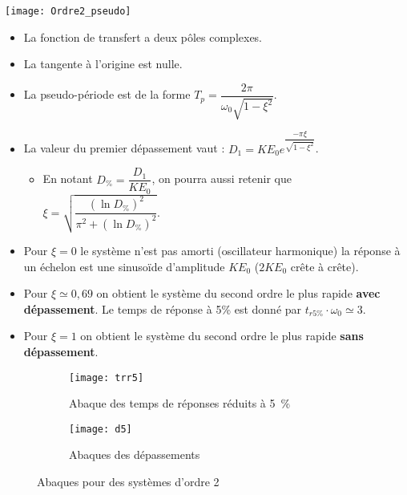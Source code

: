 \begin{marginfigure}
\texttt{[image: Ordre2\_pseudo]}
\end{marginfigure}

\begin{resultat}
\begin{itemize} 
\item La fonction de transfert a deux pôles complexes.
\item La tangente à l'origine est nulle.
\item La pseudo-période est de la forme $T_p=\dfrac{2\pi }{\omega_0 \sqrt{1-\xi^2}}$.
\item La valeur du premier dépassement vaut :  $D_1=KE_0e^{\dfrac{-\pi \xi }{\sqrt{1-\xi^2}}}$.
\begin{itemize}
\item En notant $D_{\%} =\dfrac{D_1}{KE_0}$, on pourra aussi retenir que $\xi = \sqrt{\dfrac{(\ln D_{\%})^2}{\pi^2 + (\ln D_{\%})^2}}$.
\end{itemize}
\end{itemize}
\end{resultat}

\begin{resultat}
\begin{itemize}
\item Pour $\xi=0$ le système n'est pas amorti (oscillateur harmonique) la réponse à un échelon est une sinusoïde d'amplitude $KE_0$ ($2KE_0$ crête à crête).  
\item Pour $\xi\simeq 0,69$  on obtient le système du second ordre le plus rapide \textbf{avec dépassement}. 
Le temps de réponse à 5\% est donné par $t_{r 5\%} \cdot \omega_0 \simeq 3$.
\item Pour $\xi =1$ on obtient le système du second ordre le plus rapide \textbf{sans dépassement}.

\end{itemize}
\end{resultat}


\begin{figure}
\centering
\begin{subfigure}{0.49\textwidth}
    \texttt{[image: trr5]}
    \caption{Abaque des temps de réponses réduits à 5\, \%}
    \label{fig:t5}
\end{subfigure}
\hfill
\begin{subfigure}{0.49\textwidth}
    \texttt{[image: d5]}
    \caption{Abaques des dépassements}
    \label{fig:abaque_dep}
\end{subfigure}
        
\caption{Abaques pour des systèmes d'ordre 2}
\label{fig:abaque}
\end{figure}

